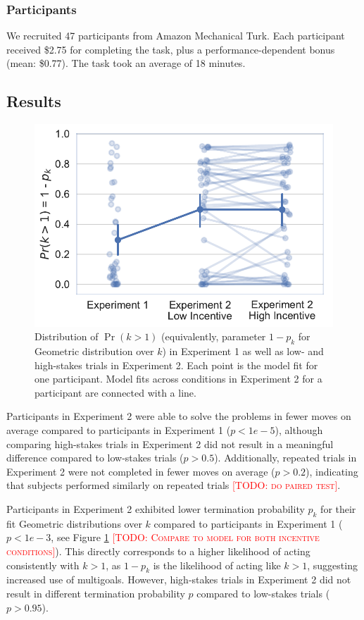 \documentclass[10pt,letterpaper]{article}
\newcommand{\todo}[1]{\textcolor{red}{\textsc{[TODO: #1]}}}
\begin{document}
\subsubsection{Participants}
We recruited 47 participants from Amazon Mechanical Turk. Each participant received \$2.75 for completing the task, plus a performance-dependent bonus (mean: \$0.77). The task took an average of 18 minutes.

\subsection{Results}

\begin{figure}[ht]
    \centering
    \includegraphics[scale=0.55]{geom-k-p}
    \caption{Distribution of $\Pr(k > 1)$ (equivalently, parameter $1-p_k$ for Geometric distribution over $k$) in Experiment 1 as well as low- and high-stakes trials in Experiment 2. Each point is the model fit for one participant. Model fits across conditions in Experiment 2 for a participant are connected with a line.}
    \label{fig:p_k}
\end{figure}

Participants in Experiment 2 were able to solve the problems in fewer moves on average compared to participants in Experiment 1 ($p < 1e-5$), although comparing high-stakes trials in Experiment 2 did not result in a meaningful difference compared to low-stakes trials ($p > 0.5$). Additionally, repeated trials in Experiment 2 were not completed in fewer moves on average ($p > 0.2$), indicating that subjects performed similarly on repeated trials \todo{do paired test}.

Participants in Experiment 2 exhibited lower termination probability $p_k$ for their fit Geometric distributions over $k$ compared to participants in Experiment 1 ($p < 1e-3$, see Figure \ref{fig:p_k} \todo{Compare to model for both incentive conditions}). This directly corresponds to a higher likelihood of acting consistently with $k > 1$, as $1-p_k$ is the likelihood of acting like $k > 1$, suggesting increased use of multigoals. However, high-stakes trials in Experiment 2 did not result in different termination probability $p$ compared to low-stakes trials ($p > 0.95$).
\end{document}

